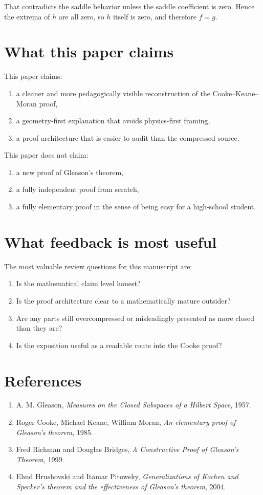 \documentclass[11pt]{article}
\begin{document}
That contradicts the saddle behavior unless the saddle coefficient is zero. Hence the extrema of $h$ are all zero, so $h$ itself is zero, and therefore $f=g$.

\section{What this paper claims}
This paper claims:
\begin{enumerate}[label=\arabic*.]
\item a cleaner and more pedagogically visible reconstruction of the Cooke--Keane--Moran proof,
\item a geometry-first explanation that avoids physics-first framing,
\item a proof architecture that is easier to audit than the compressed source.
\end{enumerate}

This paper does not claim:
\begin{enumerate}[label=\arabic*.]
\item a new proof of Gleason's theorem,
\item a fully independent proof from scratch,
\item a fully elementary proof in the sense of being easy for a high-school student.
\end{enumerate}

\section{What feedback is most useful}
The most valuable review questions for this manuscript are:
\begin{enumerate}[label=\arabic*.]
\item Is the mathematical claim level honest?
\item Is the proof architecture clear to a mathematically mature outsider?
\item Are any parts still overcompressed or misleadingly presented as more closed than they are?
\item Is the exposition useful as a readable route into the Cooke proof?
\end{enumerate}

\section*{References}
\begin{enumerate}[label=\arabic*.]
\item A. M. Gleason, \textit{Measures on the Closed Subspaces of a Hilbert Space}, 1957.
\item Roger Cooke, Michael Keane, William Moran, \textit{An elementary proof of Gleason's theorem}, 1985.
\item Fred Richman and Douglas Bridges, \textit{A Constructive Proof of Gleason's Theorem}, 1999.
\item Ehud Hrushovski and Itamar Pitowsky, \textit{Generalizations of Kochen and Specker's theorem and the effectiveness of Gleason's theorem}, 2004.
\end{enumerate}
\end{document}

